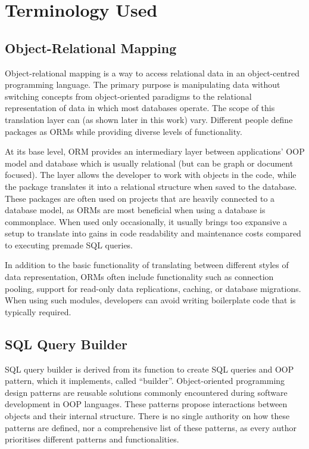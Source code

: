 \chapter{Terminology Used}
\section{Object-Relational Mapping}

Object-relational mapping is a way to access relational data in an
object-centred programming language. The primary purpose is manipulating data
without switching concepts from object-oriented paradigms to the relational
representation of data in which most databases operate. The scope of this
translation layer can (as shown later in this work) vary. Different people
define packages as ORMs while providing diverse levels of functionality.

At its base level, ORM provides an intermediary layer between applications' OOP
model and database which is usually relational (but can be graph or document
focused). The layer allows the developer to work with objects in the code, while
the package translates it into a relational structure when saved to the
database. These packages are often used on projects that are heavily connected
to a database model, as ORMs are most beneficial when using a database is
commonplace. When used only occasionally, it usually brings too expansive a
setup to translate into gains in code readability and maintenance costs compared
to executing premade SQL queries.

In addition to the basic functionality of translating between different styles
of data representation, ORMs often include functionality such as connection
pooling, support for read-only data replications, caching, or database
migrations. When using such modules, developers can avoid writing boilerplate
code that is typically required.


\section{SQL Query Builder}

SQL query builder is derived from its function to create SQL queries and OOP
pattern, which it implements, called \enquote{builder}. Object-oriented programming
design patterns are reusable solutions commonly encountered during software
development in OOP languages. These patterns propose interactions between
objects and their internal structure. There is no single authority on how these
patterns are defined, nor a comprehensive list of these patterns, as every
author prioritises different patterns and functionalities.

